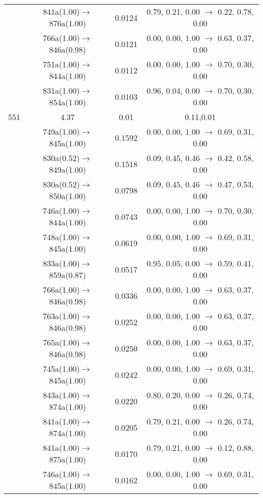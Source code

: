 \documentclass[10pt,a4paper]{article}
\begin{document}
\begin{longtable}{c|c|c|c}
 	& 841a(1.00)$\rightarrow$876a(1.00) &	 0.0124 &	 0.79, 0.21, 0.00 $\rightarrow$ 0.22, 0.78, 0.00 \\ 
 	& 766a(1.00)$\rightarrow$846a(0.98) &	 0.0121 &	 0.00, 0.00, 1.00 $\rightarrow$ 0.63, 0.37, 0.00 \\ 
 	& 751a(1.00)$\rightarrow$844a(1.00) &	 0.0112 &	 0.00, 0.00, 1.00 $\rightarrow$ 0.70, 0.30, 0.00 \\ 
 	& 831a(1.00)$\rightarrow$854a(1.00) &	 0.0103 &	 0.96, 0.04, 0.00 $\rightarrow$ 0.70, 0.30, 0.00 \\ 
 \hline551 &	 4.37 &	 0.01 &	 0.11,0.01 \\ 
  	& 749a(1.00)$\rightarrow$845a(1.00) &	 0.1592 &	 0.00, 0.00, 1.00 $\rightarrow$ 0.69, 0.31, 0.00 \\ 
 	& 830a(0.52)$\rightarrow$849a(1.00) &	 0.1518 &	 0.09, 0.45, 0.46 $\rightarrow$ 0.42, 0.58, 0.00 \\ 
 	& 830a(0.52)$\rightarrow$850a(1.00) &	 0.0798 &	 0.09, 0.45, 0.46 $\rightarrow$ 0.47, 0.53, 0.00 \\ 
 	& 746a(1.00)$\rightarrow$844a(1.00) &	 0.0743 &	 0.00, 0.00, 1.00 $\rightarrow$ 0.70, 0.30, 0.00 \\ 
 	& 748a(1.00)$\rightarrow$845a(1.00) &	 0.0619 &	 0.00, 0.00, 1.00 $\rightarrow$ 0.69, 0.31, 0.00 \\ 
 	& 833a(1.00)$\rightarrow$859a(0.87) &	 0.0517 &	 0.95, 0.05, 0.00 $\rightarrow$ 0.59, 0.41, 0.00 \\ 
 	& 766a(1.00)$\rightarrow$846a(0.98) &	 0.0336 &	 0.00, 0.00, 1.00 $\rightarrow$ 0.63, 0.37, 0.00 \\ 
 	& 763a(1.00)$\rightarrow$846a(0.98) &	 0.0252 &	 0.00, 0.00, 1.00 $\rightarrow$ 0.63, 0.37, 0.00 \\ 
 	& 765a(1.00)$\rightarrow$846a(0.98) &	 0.0250 &	 0.00, 0.00, 1.00 $\rightarrow$ 0.63, 0.37, 0.00 \\ 
 	& 745a(1.00)$\rightarrow$845a(1.00) &	 0.0242 &	 0.00, 0.00, 1.00 $\rightarrow$ 0.69, 0.31, 0.00 \\ 
 	& 843a(1.00)$\rightarrow$874a(1.00) &	 0.0220 &	 0.80, 0.20, 0.00 $\rightarrow$ 0.26, 0.74, 0.00 \\ 
 	& 841a(1.00)$\rightarrow$874a(1.00) &	 0.0205 &	 0.79, 0.21, 0.00 $\rightarrow$ 0.26, 0.74, 0.00 \\ 
 	& 841a(1.00)$\rightarrow$875a(1.00) &	 0.0170 &	 0.79, 0.21, 0.00 $\rightarrow$ 0.12, 0.88, 0.00 \\ 
 	& 746a(1.00)$\rightarrow$845a(1.00) &	 0.0162 &	 0.00, 0.00, 1.00 $\rightarrow$ 0.69, 0.31, 0.00 \\ 

\end{longtable}
\end{document}
